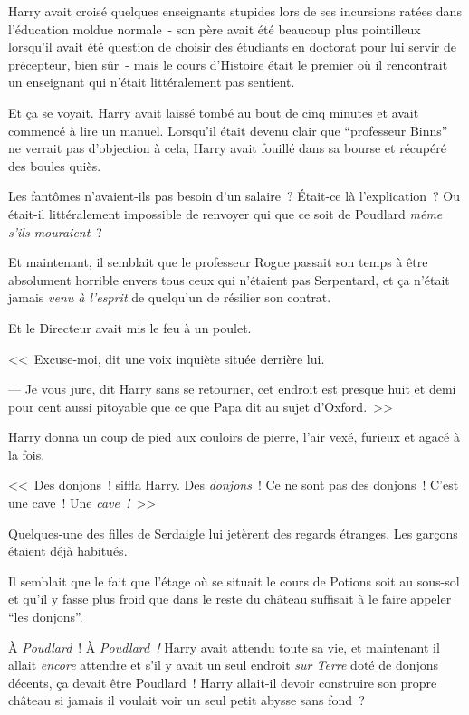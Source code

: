 Harry avait croisé quelques enseignants stupides lors de ses incursions ratées dans l'éducation moldue normale~- son père avait été beaucoup plus pointilleux lorsqu'il avait été question de choisir des étudiants en doctorat pour lui servir de précepteur, bien sûr~- mais le cours d'Histoire était le premier où il rencontrait un enseignant qui n'était littéralement pas sentient.

Et ça se voyait. Harry avait laissé tombé au bout de cinq minutes et avait commencé à lire un manuel. Lorsqu'il était devenu clair que “professeur Binns” ne verrait pas d'objection à cela, Harry avait fouillé dans sa bourse et récupéré des boules quiès.

Les fantômes n'avaient-ils pas besoin d'un salaire~? Était-ce là l'explication~? Ou était-il littéralement impossible de renvoyer qui que ce soit de Poudlard \emph{même s'ils mouraient}~?

Et maintenant, il semblait que le professeur Rogue passait son temps à être absolument horrible envers tous ceux qui n'étaient pas Serpentard, et ça n'était jamais \emph{venu à l'esprit} de quelqu'un de résilier son contrat.

Et le Directeur avait mis le feu à un poulet.

<<~Excuse-moi, dit une voix inquiète située derrière lui.

--- Je vous jure, dit Harry sans se retourner, cet endroit est presque huit et demi pour cent aussi pitoyable que ce que Papa dit au sujet d'Oxford.~>>

\later

Harry donna un coup de pied aux couloirs de pierre, l'air vexé, furieux et agacé à la fois.

<<~Des donjons~! siffla Harry. Des \emph{donjons}~! Ce ne sont pas des donjons~! C'est une cave~! Une \emph{cave~!}~>>

Quelques-une des filles de Serdaigle lui jetèrent des regards étranges. Les garçons étaient déjà habitués.

Il semblait que le fait que l'étage où se situait le cours de Potions soit au sous-sol et qu'il y fasse plus froid que dans le reste du château suffisait à le faire appeler “les donjons”.

À \emph{Poudlard}~! À \emph{Poudlard~!} Harry avait attendu toute sa vie, et maintenant il allait \emph{encore} attendre et s'il y avait un seul endroit \emph{sur Terre} doté de donjons décents, ça devait être Poudlard~! Harry allait-il devoir construire son propre château si jamais il voulait voir un seul petit abysse sans fond~?

